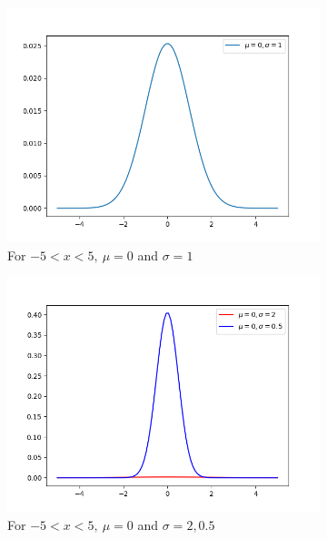     \begin{figure}[h!]
        \centering
        \begin{subfigure}[b]{0.4\linewidth}
            \includegraphics[width=\linewidth]{img/chapter2/2-5/2_5_plot_a.png}
            \caption{For $-5<x<5, \ \mu=0$ and $\sigma=1$}
        \end{subfigure}
        \begin{subfigure}[b]{0.4\linewidth}
            \includegraphics[width=\linewidth]{img/chapter2/2-5/2_5_plot_b.png}
            \caption{For $-5<x<5, \ \mu=0$ and $\sigma=2,0.5$}
        \end{subfigure}
        \begin{subfigure}[b]{0.5\linewidth}

\end{subfigure}
\end{figure}
